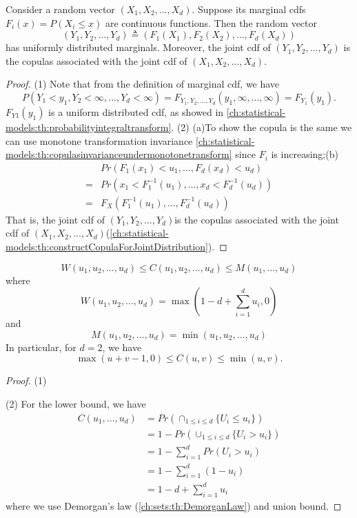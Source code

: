 \begin{refsection}
\begin{lemma}\label{ch:statistical-models:th:ProbababilityTransformForRandomVectorAndProperties}
	Consider a random vector $(X_1,X_2,...,X_d)$. Suppose its marginal cdfs $F_i(x) = P(X_i\leq x)$ are continuous functions. Then the random vector
	$$(Y_1,Y_2,...,Y_d) \triangleq (F_1(X_1),F_2(X_2),...,F_d(X_d))$$
	has uniformly distributed marginals. 
	Moreover, the joint cdf of $(Y_1,Y_2,...,Y_d)$ is the copulas associated with the joint cdf of $(X_1,X_2,...,X_d)$.  
\end{lemma}
\begin{proof}
(1)	Note that from the definition of marginal cdf, we have
	$$P(Y_1 < y_1,Y_2 < \infty, ...,Y_d < \infty) = F_{Y_1,Y_2,...,Y_d}(y_1,\infty,...,\infty) = F_{Y_1}(y_1).$$
	$F_{Y1}(y_1)$ is a uniform distributed cdf, as showed in \autoref{ch:statistical-models:th:probabilityintegraltransform}.
(2)	(a)To show the copula is the same we can use monotone transformation invariance \autoref{ch:statistical-models:th:copulasinvarianceundermonotonetransform} since $F_i$ is increasing;(b) 
\begin{align*}
&Pr(F_1(x_1) < u_1 ,...,F_d(x_d)<u_d) \\
=&Pr(x_1 < F_1^{-1}(u_1),...,x_d < F_d^{-1}(u_d)) \\
=&F_X(F_1^{-1}(u_1),...,F_d^{-1}(u_d))
\end{align*}
That is, the joint cdf of $(Y_1,Y_2,...,Y_d)$is the copulas associated with the joint cdf of $(X_1,X_2,...,X_d)$(\autoref{ch:statistical-models:th:constructCopulaForJointDistribution}).
\end{proof}

\begin{lemma}\label{ch:statistical-models:th:FrechetHoeffdingBounding}\cite[189]{mcneil2015quantitative}
	$$W(u_1,u_2,...,u_d)\leq C(u_1,u_2,...,u_d) \leq M(u_1,...,u_d)$$
	where
	$$W(u_1,u_2,...,u_d) = \max(1 - d + \sum_{i=1}^du_i,0)$$
	and
	$$M(u_1,u_2,...,u_d) = \min(u_1,u_2,...,u_d)$$
	In particular, for $d=2$, we have
	$$\max(u+v-1,0) \leq C(u,v) \leq \min(u,v).$$
\end{lemma}
\begin{proof}
(1) 

(2) For the lower bound, we have
\begin{align*}
C(u_1,...,u_d) &= Pr(\cap_{1\leq i\leq d}\{U_i\leq u_i\}) \\
&= 1 - Pr(\cup_{1\leq i\leq d}\{U_i > u_i\})\\
&= 1 - \sum_{i=1}^d Pr(U_i > u_i) \\
&=1 -  \sum_{i=1}^d(1 - u_i) \\
&=1 - d + \sum_{i=1}^du_i 
\end{align*}
where we use Demorgan's law (\autoref{ch:sets:th:DemorganLaw}) and union bound.
\end{proof}



\end{refsection}
